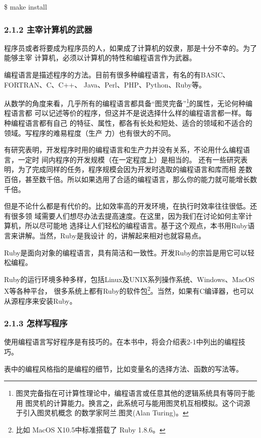 \documentclass[11pt]{ctexart}
\begin{document}
\$ make install

\subsubsection{2.1.2 主宰计算机的武器}
\label{sec:orgheadline10}

程序员或者将要成为程序员的人，如果成了计算机的奴隶，那是十分不幸的。为了能够主宰
计算机，必须以计算机的特性和编程语言作为武器。

编程语言是描述程序的方法。目前有很多种编程语言，有名的有BASIC、FORTRAN、C、C++、
Java、Perl、PHP、Python、Ruby等。

从数学的角度来看，几乎所有的编程语言都具备“图灵完备”\footnote{图灵完备指在可计算性理论中，编程语言或任意其他的逻辑系统具有等同于能用
图灵机的计算能力。换言之，此系统可与能用图灵机互相模拟。这个词源于引入图灵机概念
的数学家阿兰.图灵(Alan Turing)。}的属性，无论何种编程语言都
可以记述等价的程序，但这并不是说选择什么样的编程语言都一样。每种编程语言都有自己
的特征、属性，都各有长处和短处、适合的领域和不适合的领域。写程序的难易程度（生产
力）也有很大的不同。

有研究表明，开发程序时用的编程语言和生产力并没有关系，不论用什么编程语言，一定时
间内程序的开发规模（在一定程度上）是相当的。
还有一些研究表明，为了完成同样的任务，程序规模会因为开发时选取的编程语言和库而相
差数百倍，甚至数千倍。所以如果选用了合适的编程语言，那么你的能力就可能增长数千倍。

但是不论什么都是有代价的。比如效率高的开发环境，在执行时效率往往很低。还有很多领
域需要人们想尽办法去提高速度。在这里，因为我们在讨论如何主宰计算机，所以尽可能地
选择让人们轻松的编程语言。基于这个观点，本书用Ruby语言来讲解。当然，Ruby是我设计
的，讲解起来相对也就容易点。

Ruby是面向对象的编程语言，具有简洁和一致性。开发Ruby的宗旨是用它可以轻松编程。


Ruby的运行环境多种多样，包括Linux及UNIX系列操作系统、Windows、MacOS X等各种平台，
很多系统上都有Ruby的软件包\footnote{比如 MacOS X10.5中标准搭载了 Ruby 1.8.6。}。当然，如果有C编译器，也可以从源程序来安装Ruby。

\subsubsection{2.1.3 怎样写程序}
\label{sec:orgheadline11}

使用编程语言写好程序是有技巧的。在本书中，将会介绍表2-1中列出的编程技巧。

表中的编程风格指的是编程的细节，比如变量名的选择方法、函数的写法等。
\end{document}
